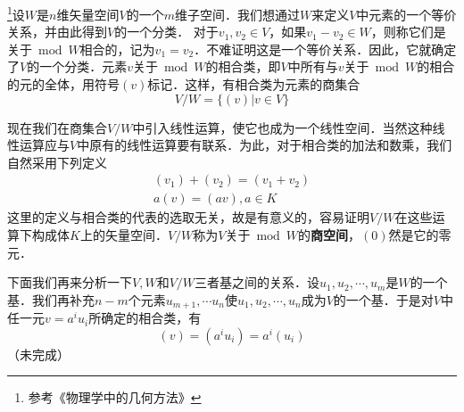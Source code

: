 

\footnote{参考《物理学中的几何方法》}设$W$是$n$维矢量空间$V$的一个$m$维子空间．我们想通过$W$来定义$V$中元素的一个等价关系，并由此得到$V$的一个分类．
对于$v_1,v_2\in V$，如果$v_1-v_2\in W$，则称它们是关于$\bmod W $相合的，记为$v_1=v_2$．不难证明这是一个等价关系．因此，它就确定了$V $的一个分类．元素$v $关于$\bmod W $的相合类，即$V $中所有与$v $关于$\bmod W $的相合的元的全体，用符号$(v) $标记．这样，有相合类为元素的商集合
\begin{equation}
V / W=\{(v) | v \in V\}
\end{equation}

现在我们在商集合$V/W $中引入线性运算，使它也成为一个线性空间．当然这种线性运算应与$V $中原有的线性运算要有联系．为此，对于相合类的加法和数乘，我们自然采用下列定义
\begin{equation}
\begin{array}{l}\left(v_{1}\right)+\left(v_{2}\right)=\left(v_{1}+v_{2}\right) \\ a(v)=(a v), a \in K\end{array}
\end{equation}
这里的定义与相合类的代表的选取无关，故是有意义的，容易证明$V/W $在这些运算下构成体$K $上的矢量空间．$V/W $称为$V $关于$\bmod W$的\textbf{商空间}，$(0)$然是它的零元．

下面我们再来分析一下$V,W$和$V/W $三者基之间的关系．设$u_1,u_2,\cdots,u_m$是$W $的一个基．我们再补充$n- m$个元素${u}_{m+1}, \cdots {u}_{n}$使$u_{1}, u_{2}, \cdots, u_{n}$成为$V$的一个基．于是对$V $中任一元$v=a^iu_i$所确定的相合类，有
\begin{equation}
(v)=\left(a^{i} u_{i}\right)=a^{i}\left(u_{i}\right)
\end{equation}
（未完成）
